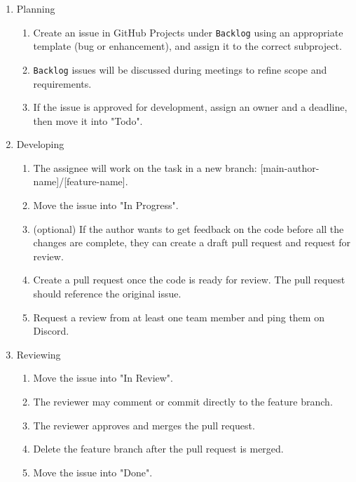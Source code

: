 \documentclass{article}
\begin{document}
\begin{enumerate}
  \item Planning
        \begin{enumerate}
          \item Create an issue in GitHub Projects under \texttt{Backlog} using an appropriate
                template (bug or enhancement), and assign it to the correct subproject.
          \item \texttt{Backlog} issues will be discussed during meetings to refine scope and
                requirements.
          \item If the issue is approved for development, assign an owner and a deadline, then
                move it into "Todo".
        \end{enumerate}
  \item Developing
        \begin{enumerate}
          \item The assignee will work on the task in a new branch:
                [main-author-name]/[feature-name].
          \item Move the issue into "In Progress".
          \item (optional) If the author wants to get feedback on the code before all the
                changes are complete, they can create a draft pull request and request for
                review.
          \item Create a pull request once the code is ready for review. The pull request
                should reference the original issue.
          \item Request a review from at least one team member and ping them on Discord.
        \end{enumerate}
  \item Reviewing
        \begin{enumerate}
          \item Move the issue into "In Review".
          \item The reviewer may comment or commit directly to the feature branch.
          \item The reviewer approves and merges the pull request.
          \item Delete the feature branch after the pull request is merged.
          \item Move the issue into "Done".
        \end{enumerate}
\end{enumerate}
\end{document}
